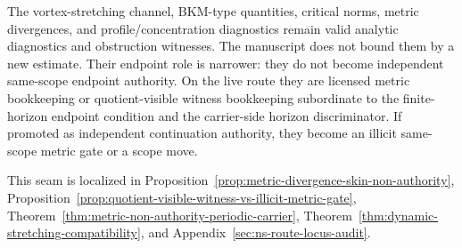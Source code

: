 \begin{tcolorbox}[breakable, title={Vortex-stretching seam discipline}, colback=green!2!white, colframe=green!45!black]
The vortex-stretching channel, BKM-type quantities, critical norms, metric divergences, and profile/concentration diagnostics remain valid analytic diagnostics and obstruction witnesses. The manuscript does not bound them by a new estimate. Their endpoint role is narrower: they do not become independent same-scope endpoint authority. On the live route they are licensed metric bookkeeping or quotient-visible witness bookkeeping subordinate to the finite-horizon endpoint condition and the carrier-side horizon discriminator. If promoted as independent continuation authority, they become an illicit same-scope metric gate or a scope move.

\medskip
This seam is localized in Proposition~\ref{prop:metric-divergence-skin-non-authority}, Proposition~\ref{prop:quotient-visible-witness-vs-illicit-metric-gate}, Theorem~\ref{thm:metric-non-authority-periodic-carrier}, Theorem~\ref{thm:dynamic-stretching-compatibility}, and Appendix~\ref{sec:ns-route-locus-audit}.
\end{tcolorbox}

